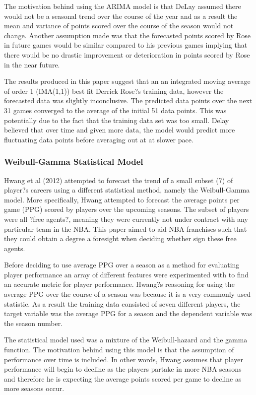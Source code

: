 \documentclass[a4paper,11pt,twoside]{article}
\begin{document}
The motivation behind using the ARIMA model is that DeLay assumed there would not be a seasonal trend over the course of the year and as a result the mean and variance of points scored over the course of the season would not change. Another assumption made was that the forecasted points scored by Rose in future games would be similar compared to his previous games implying that there would be no drastic improvement or deterioration in points scored by Rose in the near future.

The results produced in this paper suggest that an an integrated moving average of order 1 (IMA(1,1)) best fit Derrick Rose?s training data, however the forecasted data was slightly inconclusive. The predicted data points over the next 31 games converged to the average of the initial 51 data points. This was potentially due to the fact that the training data set was too small. Delay believed that over time and given more data, the model would predict more fluctuating data points before averaging out at at slower pace. 


\subsubsection{Weibull-Gamma Statistical Model}

Hwang et al (2012) attempted to forecast the trend of a small subset (7) of player?s careers using a different statistical method, namely the Weibull-Gamma model. More specifically, Hwang attempted to forecast the average points per game (PPG) scored by players over the upcoming seasons. The subset of players were all ?free agents?, meaning they were currently not under contract with any particular team in the NBA. This paper aimed to aid NBA franchises such that they could obtain a degree a foresight when deciding whether sign these free agents.


Before deciding to use average PPG over a season as a method for evaluating player performance an array of different features were experimented with to find an accurate metric for player performance. Hwang?s reasoning for using the average PPG over the course of a season was because it is a very commonly used statistic. As a result the training data consisted of seven different players, the target variable was the average PPG for a season and the dependent variable was the season number. 

The statistical model used was a mixture of the Weibull-hazard and the gamma function. The motivation behind using this model is that the assumption of performance over time is included. In other words, Hwang assumes that player performance will begin to decline as the players partake in more NBA seasons and therefore he is expecting the average points scored per game to decline as more seasons occur.
\end{document}
